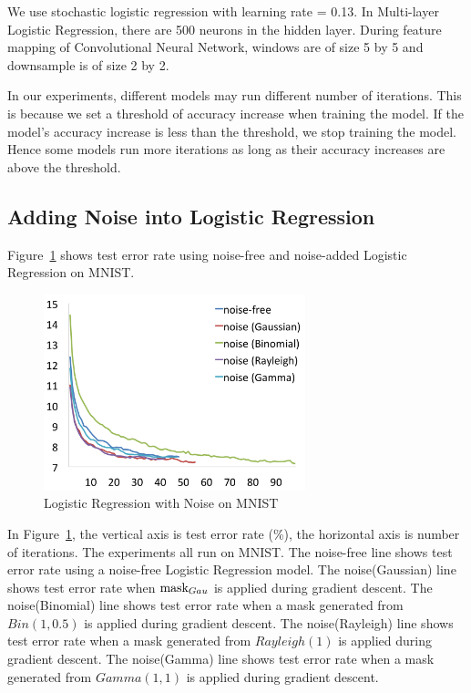 We use stochastic logistic regression with learning rate = 0.13.
In Multi-layer Logistic Regression, there are 500 neurons in the hidden
layer. During feature mapping of Convolutional Neural Network, windows
are of size 5 by 5 and downsample is of size 2 by 2.

In our experiments, different models may run different number of
iterations. This is because we set a threshold of accuracy increase when
training the model. If the model's accuracy increase is less than the
threshold, we stop training the model. Hence some models run more
iterations as long as their accuracy increases are above the threshold.

\subsection{Adding Noise into Logistic Regression}
Figure~\ref{logistic} shows test error rate using noise-free and
noise-added Logistic Regression on MNIST.
\begin{figure}[!htbp]
\centering
\includegraphics[width=215pt]{f-figs/logistic.png}
\caption{Logistic Regression with Noise on MNIST}
\label{logistic}
\end{figure}

In Figure~\ref{logistic}, the vertical axis is test error rate (\%), the
horizontal axis is number of iterations. The experiments all run on MNIST.
The noise-free line shows test error rate using a noise-free Logistic
Regression model.
The noise(Gaussian) line shows test error rate when $\text{mask}_{Gau}$ is applied during gradient descent.
The noise(Binomial) line shows test error rate when a mask generated from
$Bin(1,0.5)$ is applied during gradient descent.
The noise(Rayleigh) line shows test error rate when a mask generated from
$Rayleigh(1)$ is applied during gradient descent.
The noise(Gamma) line shows test error rate when a mask generated from
$Gamma(1,1)$ is applied during gradient descent.

